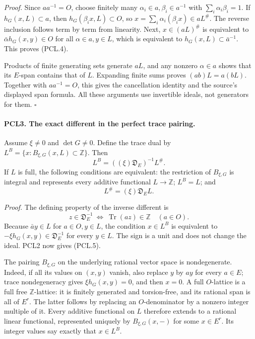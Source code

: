 \emph{Proof.}
Since \(aa^{-1}=O\), choose finitely many
\(\alpha_i\in a,\beta_i\in a^{-1}\) with
\(\sum_i\alpha_i\beta_i=1\).  If \(h_G(x,L)\subset a\),
then \(h_G(\beta_i x,L)\subset O\), so
\(x=\sum_i\alpha_i(\beta_i x)\in aL^\#\).
The reverse inclusion follows term by term from linearity.
Next, \(x\in(aL)^\#\) is equivalent to
\(\bar\alpha h_G(x,y)\in O\) for all
\(\alpha\in a,y\in L\), which is equivalent to
\(h_G(x,L)\subset\bar a^{-1}\).  This proves (PCL.4).

Products of finite generating sets generate \(aL\), and any
nonzero \(\alpha\in a\) shows that its \(E\)-span contains
that of \(L\).  Expanding finite sums proves
\((ab)L=a(bL)\).  Together with \(aa^{-1}=O\), this gives
the cancellation identity and the source's displayed span
formula.  All these arguments use invertible ideals, not
generators for them. \hfill\(\square\)

\paragraph{PCL3. The exact different in the perfect trace pairing.}
\label{claim:PCL3}
Assume \(\xi\ne0\) and \(\det G\ne0\).  Define the
trace dual by
\(L^B=\{x:B_{\xi,G}(x,L)\subset\mathbb Z\}\).
Then
\[
 L^B=((\xi)\mathfrak D_E)^{-1}L^\# .              \tag{PCL.5}
\]
If \(L\) is full, the following conditions are equivalent:
the restriction of \(B_{\xi,G}\) is integral and represents
every additive functional \(L\to\mathbb Z\); \(L^B=L\);
and
\[
                         L^\#=(\xi)\mathfrak D_E L. \tag{PCL.6}
\]

\emph{Proof.}
The defining property of the inverse different is
\[
 z\in\mathfrak D_E^{-1}
       \ \Longleftrightarrow\
             \operatorname{Tr}(az)\in\mathbb Z\quad(a\in O).
\]
Because \(\bar a y\in L\) for \(a\in O,y\in L\), the
condition \(x\in L^B\) is equivalent to
\(-\xi h_G(x,y)\in\mathfrak D_E^{-1}\) for every
\(y\in L\).  The sign is a unit and does not change the
ideal.  PCL2 now gives (PCL.5).

The pairing \(B_{\xi,G}\) on the underlying rational vector
space is nondegenerate.  Indeed, if all its values on
\((x,y)\) vanish, also replace \(y\) by \(ay\) for every
\(a\in E\); trace nondegeneracy gives
\(\xi h_G(x,y)=0\), and then \(x=0\).
A full \(O\)-lattice is a full free \(\mathbb Z\)-lattice:
it is finitely generated and torsion-free, and its rational
span is all of \(E^r\).  The latter follows by replacing
an \(O\)-denominator by a nonzero integer multiple of it.
Every additive functional on \(L\) therefore extends to a
rational linear functional, represented uniquely by
\(B_{\xi,G}(x,-)\) for some \(x\in E^r\).  Its integer
values say exactly that \(x\in L^B\).

